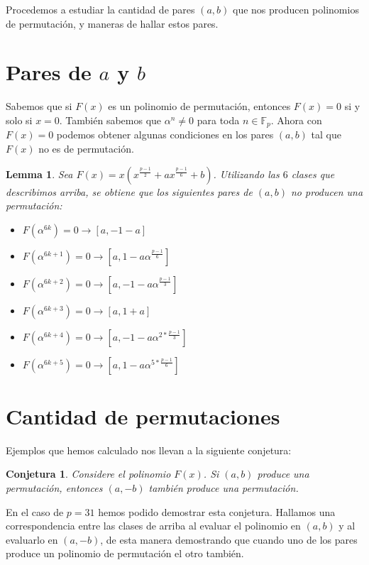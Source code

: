 \documentclass[12pt]{article}
\newtheorem{conjecture}{Conjetura}
\newtheorem{lemma}{Lemma}
\begin{document}
Procedemos a estudiar la cantidad de pares $(a,b)$ que nos producen polinomios de permutaci\'on, y maneras de hallar estos pares.

\section{Pares de $a$ y $b$}

Sabemos que si $F(x)$ es un polinomio de permutaci\'on, entonces $F(x) = 0$ si y solo si $x=0$. Tambi\'en sabemos que $\alpha^n \neq 0 $ para toda $n \in \mathbb{F}_{p}$. Ahora con $F(x)=0$ podemos obtener algunas condiciones en los pares $(a,b)$ tal que $F(x)$ no es de permutaci\'on.

\begin{lemma}
	Sea $F(x) = x(x^{\frac{p-1}{2}}+ax^{\frac{p-1}{6}}+b)$. Utilizando las $6$ clases que describimos arriba, se obtiene que los siguientes pares de $(a,b)$ no producen una permutaci\'on:
\end{lemma}

\begin{itemize}
	\item $F(\alpha^{6k}) = 0 \rightarrow [a,-1-a]$
	\item $F(\alpha^{6k+1}) = 0 \rightarrow [a,1-a\alpha^{\frac{p-1}{6}}]$
	\item $F(\alpha^{6k+2}) = 0 \rightarrow [a,-1-a\alpha^{\frac{p-1}{3}}]$
	\item $F(\alpha^{6k+3}) = 0 \rightarrow [a,1+a]$
	\item $F(\alpha^{6k+4}) = 0 \rightarrow [a,-1-a\alpha^{2*\frac{p-1}{3}}]$
	\item $F(\alpha^{6k+5}) = 0 \rightarrow [a,1-a\alpha^{5*\frac{p-1}{6}}]$ 
\end{itemize}


\section{Cantidad de permutaciones}\label{orto}

Ejemplos que hemos calculado nos llevan a la siguiente conjetura:
\begin{conjecture}
	Considere el polinomio $F(x)$. Si $(a,b)$ produce una permutaci\'on, entonces $(a,-b)$ tambi\'en produce una permutaci\'on.
\end{conjecture}

En el caso de $p=31$ hemos podido demostrar esta conjetura. Hallamos una correspondencia entre las clases de arriba al evaluar el polinomio en $(a,b)$ y al evaluarlo en $(a,-b)$, de esta manera demostrando que cuando uno de los pares produce un polinomio de permutaci\'on el otro tambi\'en.
\end{document}
